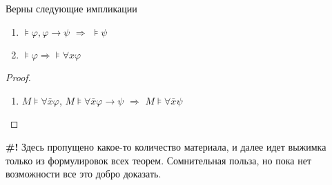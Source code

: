 \documentclass[unicode,10pt]{article}
\begin{document}
\begin{lemma}
  Верны следующие импликации
  \begin{enumerate}
  \item $⊧φ,φ→ψ$ $⇒$ $⊧ψ$
  \item $⊧φ ⇒ ⊧∀xφ$
  \end{enumerate}
\end{lemma}
\begin{proof}
  \begin{enumerate}
  \item $M⊧ ∀\bar xφ$, $M⊧∀\bar xφ→ψ$ $⇒$ $M⊧∀\bar xψ$
  \end{enumerate}
\end{proof}

\begin{petit}
  {\large\bf \#!} Здесь пропущено какое-то количество материала, и
  далее идет выжимка только из формулировок всех теорем. Сомнительная
  польза, но пока нет возможности все это добро доказать.
\end{petit}
\end{document}
